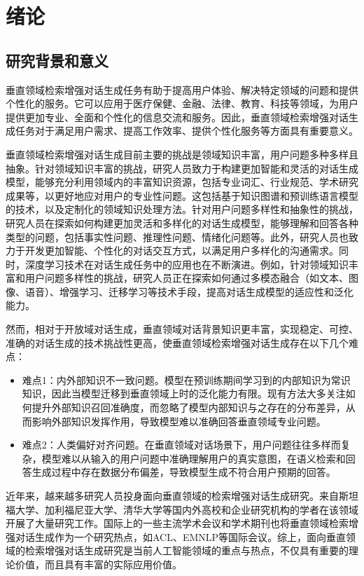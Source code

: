 \chapter{绪论}
%
\section{研究背景和意义}
%
垂直领域检索增强对话生成任务有助于提高用户体验、解决特定领域的问题和提供个性化的服务。它可以应用于医疗保健、金融、法律、教育、科技等领域，为用户提供更加专业、全面和个性化的信息交流和服务。因此，垂直领域检索增强对话生成任务对于满足用户需求、提高工作效率、提供个性化服务等方面具有重要意义。

垂直领域检索增强对话生成目前主要的挑战是领域知识丰富，用户问题多种多样且抽象。针对领域知识丰富的挑战，研究人员致力于构建更加智能和灵活的对话生成模型，能够充分利用领域内的丰富知识资源，包括专业词汇、行业规范、学术研究成果等，以更好地应对用户的专业性问题。这包括基于知识图谱和预训练语言模型的技术，以及定制化的领域知识处理方法。针对用户问题多样性和抽象性的挑战，研究人员在探索如何构建更加灵活和多样化的对话生成模型，能够理解和回答各种类型的问题，包括事实性问题、推理性问题、情绪化问题\cite{JSJX202312001}等。此外，研究人员也致力于开发更加智能、个性化的对话交互方式，以满足用户多样化的沟通需求。同时，深度学习技术在对话生成任务中的应用也在不断演进。例如，针对领域知识丰富和用户问题多样性的挑战，研究人员正在探索如何通过多模态融合（如文本、图像、语音）、增强学习、迁移学习等技术手段，提高对话生成模型的适应性和泛化能力。

然而，相对于开放域对话生成，垂直领域对话背景知识更丰富，实现稳定、可控、准确的对话生成的技术挑战性更高，使垂直领域检索增强对话生成存在以下几个难点：

\begin{itemize}[topsep = 0 pt, itemsep= 0 pt, parsep=0pt, partopsep=0pt, leftmargin=36pt, itemindent=0pt, labelsep=6pt, listparindent=24pt]
	\item 难点1：内外部知识不一致问题。模型在预训练期间学习到的内部知识为常识知识，因此当模型迁移到垂直领域上时的泛化能力有限。现有方法大多关注如何提升外部知识召回准确度，而忽略了模型内部知识与之存在的分布差异，从而影响外部知识发挥作用，导致模型难以准确回答垂直领域专业问题。
	\item 难点2：人类偏好对齐问题。在垂直领域对话场景下，用户问题往往多样而复杂，模型难以从输入的用户问题中准确理解用户的真实意图，在语义检索和回答生成过程中存在数据分布偏差，导致模型生成不符合用户预期的回答。
\end{itemize}

近年来，越来越多研究人员投身面向垂直领域的检索增强对话生成研究\cite{RJXB202402009,DBLP:journals/corr/abs-2305-03653,DBLP:journals/corr/abs-2310-11511}。来自斯坦福大学、加利福尼亚大学、清华大学等国内外高校和企业研究机构的学者在该领域开展了大量研究工作\cite{DBLP:conf/emnlp/WangYW23,DBLP:journals/corr/abs-2306-16092}。国际上的一些主流学术会议和学术期刊也将垂直领域检索增强对话生成作为一个研究热点，如ACL、EMNLP等国际会议\cite{DBLP:conf/acl/ZhouZHHZ20,DBLP:conf/emnlp/JungSL20}。综上，面向垂直领域的检索增强对话生成研究是当前人工智能领域的重点与热点，不仅具有重要的理论价值，而且具有丰富的实际应用价值。

